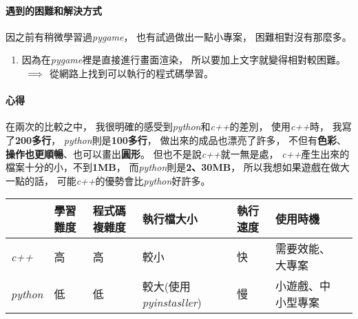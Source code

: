 \documentclass[12pt,oneside]{ctexart}
\begin{document}
\paragraph{遇到的困難和解決方式}
\begin{adjustwidth}{2em}{0em}
    因之前有稍微學習過\textit{pygame}，
    也有試過做出一點小專案，
    困難相對沒有那麼多。
    \begin{enumerate}
        \item 
            因為在\textit{pygame}裡是直接進行畫面渲染，
            所以要加上文字就變得相對較困難。
            $\\\implies$ 從網路上找到可以執行的程式碼學習。
    \end{enumerate}
\end{adjustwidth}

\paragraph{心得}
\begin{adjustwidth}{2em}{0em}
    在兩次的比較之中，
    我很明確的感受到\textit{python}和\textit{c++}的差別，
    使用\textit{c++}時，
    我寫了\textbf{200多行}，
    \textit{python}則是\textbf{100多行}，
    做出來的成品也漂亮了許多，
    不但有\textbf{色彩}、\textbf{操作也更順暢}、也可以畫出\textbf{圓形}。
    但也不是說\textit{c++}就一無是處，
    \textit{c++}產生出來的檔案十分的小，不到\textbf{1MB}，
    而\textit{python}則是\textbf{2、30MB}，
    所以我想如果遊戲在做大一點的話，
    可能\textit{c++}的優勢會比\textit{python}好許多。
\end{adjustwidth}

\begin{center}
    
\begin{tabular}{l|*{5}{|l}l}
                      & 學習難度 & 程式碼複雜度 & 執行檔大小                          & 執行速度  & 使用時機                   \\\hline\hline
    \textit{c++}      & 高       & 高           & 較小                                & 快       & 需要效能、大專案           \\\hline 
    \textit{python}   & 低       & 低           & 較大(使用\textit{pyinstasller})     & 慢       & 小遊戲、中小型專案 
\end{tabular}

\end{center}


\clearpage
\end{document}
